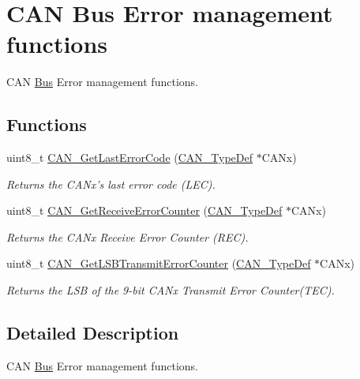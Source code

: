 \hypertarget{group___c_a_n___group5}{}\section{C\+A\+N Bus Error management functions}
\label{group___c_a_n___group5}


C\+A\+N \hyperlink{class_bus}{Bus} Error management functions.  


\subsection*{Functions}
\begin{DoxyCompactItemize}
\item 
uint8\+\_\+t \hyperlink{group___c_a_n___group5_gaaee721a392b6b21bfd15dc160aeb6924}{C\+A\+N\+\_\+\+Get\+Last\+Error\+Code} (\hyperlink{struct_c_a_n___type_def}{C\+A\+N\+\_\+\+Type\+Def} $\ast$C\+A\+Nx)
\begin{DoxyCompactList}\small\item\em Returns the C\+A\+Nx's last error code (L\+E\+C). \end{DoxyCompactList}\item 
uint8\+\_\+t \hyperlink{group___c_a_n___group5_ga6903eecbec40eb1361d915ddde9a3274}{C\+A\+N\+\_\+\+Get\+Receive\+Error\+Counter} (\hyperlink{struct_c_a_n___type_def}{C\+A\+N\+\_\+\+Type\+Def} $\ast$C\+A\+Nx)
\begin{DoxyCompactList}\small\item\em Returns the C\+A\+Nx Receive Error Counter (R\+E\+C). \end{DoxyCompactList}\item 
uint8\+\_\+t \hyperlink{group___c_a_n___group5_ga85ee0c35bf7ca15d4e4c862eef534843}{C\+A\+N\+\_\+\+Get\+L\+S\+B\+Transmit\+Error\+Counter} (\hyperlink{struct_c_a_n___type_def}{C\+A\+N\+\_\+\+Type\+Def} $\ast$C\+A\+Nx)
\begin{DoxyCompactList}\small\item\em Returns the L\+S\+B of the 9-\/bit C\+A\+Nx Transmit Error Counter(\+T\+E\+C). \end{DoxyCompactList}\end{DoxyCompactItemize}


\subsection{Detailed Description}
C\+A\+N \hyperlink{class_bus}{Bus} Error management functions. 

